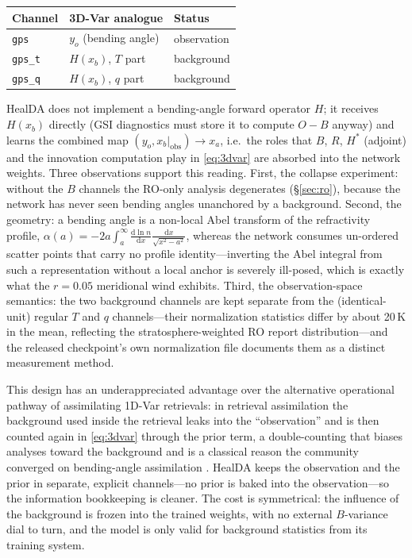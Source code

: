 \documentclass[twocolumn,11pt]{article}
\begin{document}
\begin{center}
\small
\begin{tabular}{@{}lll@{}}
\toprule
Channel & 3D-Var analogue & Status \\
\midrule
\texttt{gps}    & $y_o$ (bending angle) & observation \\
\texttt{gps\_t} & $H(x_b)$, $T$ part    & background \\
\texttt{gps\_q} & $H(x_b)$, $q$ part    & background \\
\bottomrule
\end{tabular}
\end{center}

HealDA does not implement a bending-angle forward operator $H$; it
receives $H(x_b)$ directly (GSI diagnostics must store it to compute
$O-B$ anyway) and learns the combined map
$(y_o, x_b|_{\mathrm{obs}})\!\rightarrow\!x_a$, i.e.\ the roles that
$B$, $R$, $H^{\ast}$ (adjoint) and the innovation computation play in
\eqref{eq:3dvar} are absorbed into the network weights. Three
observations support this reading. First, the collapse experiment:
without the $B$ channels the RO-only analysis degenerates
(\S\ref{sec:ro}), because the network has never seen bending angles
unanchored by a background. Second, the geometry: a bending angle is
a non-local Abel transform of the refractivity profile,
$\alpha(a) = -2a\int_a^{\infty} \frac{\mathrm{d}\ln n}{\mathrm{d}x}
\frac{\mathrm{d}x}{\sqrt{x^2-a^{2}}}$, whereas the network consumes
un-ordered scatter points that carry no profile identity---inverting
the Abel integral from such a representation without a local anchor
is severely ill-posed, which is exactly what the $r=0.05$ meridional
wind exhibits. Third, the observation-space semantics: the two
background channels are kept separate from the (identical-unit)
regular $T$ and $q$ channels---their normalization statistics differ
by about 20\,K in the mean, reflecting the stratosphere-weighted
RO report distribution---and the released checkpoint's own
normalization file documents them as a distinct measurement method.

This design has an underappreciated advantage over the alternative
operational pathway of assimilating 1D-Var retrievals: in retrieval
assimilation the background used inside the retrieval leaks into the
``observation'' and is then counted again in \eqref{eq:3dvar}
through the prior term, a double-counting that biases analyses
toward the background and is a classical reason the community
converged on bending-angle assimilation
\citep{cucurull2008utilization,healy2006assimilation}. HealDA keeps
the observation and the prior in separate, explicit channels---no
prior is baked into the observation---so the information bookkeeping
is cleaner. The cost is symmetrical: the influence of the background
is frozen into the trained weights, with no external $B$-variance
dial to turn, and the model is only valid for background statistics
from its training system.
\end{document}
